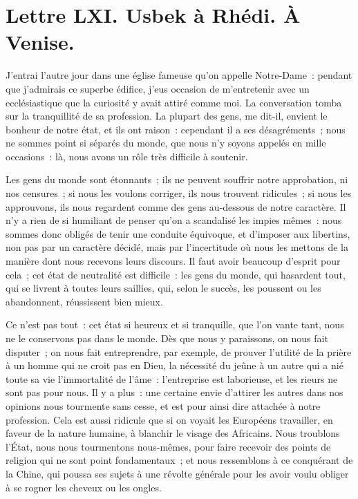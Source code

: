 \documentclass[french,twoside]{book} %
\newcommand{\dateline}[1]{\medskip{\RaggedLeft{#1}\par}\bigskip}
\begin{document}
\dateline{À Paris, le 18 de la lune de Saphar, 1714.}
\section[{Lettre LXI. Usbek à Rhédi. À Venise.}]{Lettre LXI. Usbek à Rhédi. À Venise.}\renewcommand{\leftmark}{Lettre LXI. Usbek à Rhédi. À Venise.}

\noindent J’entrai l’autre jour dans une église fameuse qu’on appelle Notre-Dame : pendant que j’admirais ce superbe édifice, j’eus occasion de m’entretenir avec un ecclésiastique que la curiosité y avait attiré comme moi. La conversation tomba sur la tranquillité de sa profession. La plupart des gens, me dit-il, envient le bonheur de notre état, et ils ont raison : cependant il a ses désagréments ; nous ne sommes point si séparés du monde, que nous n’y soyons appelés en mille occasions : là, nous avons un rôle très difficile à soutenir.\par
Les gens du monde sont étonnants ; ils ne peuvent souffrir notre approbation, ni nos censures ; si nous les voulons corriger, ils nous trouvent ridicules ; si nous les approuvons, ils nous regardent comme des gens au-dessous de notre caractère. Il n’y a rien de si humiliant de penser qu’on a scandalisé les impies mêmes : nous sommes donc obligés de tenir une conduite équivoque, et d’imposer aux libertins, non pas par un caractère décidé, mais par l’incertitude où nous les mettons de la manière dont nous recevons leurs discours. Il faut avoir beaucoup d’esprit pour cela ; cet état de neutralité est difficile : les gens du monde, qui hasardent tout, qui se livrent à toutes leurs saillies, qui, selon le succès, les poussent ou les abandonnent, réussissent bien mieux.\par
Ce n’est pas tout : cet état si heureux et si tranquille, que l’on vante tant, nous ne le conservons pas dans le monde. Dès que nous y paraissons, on nous fait disputer ; on nous fait entreprendre, par exemple, de prouver l’utilité de la prière à un homme qui ne croit pas en Dieu, la nécessité du jeûne à un autre qui a nié toute sa vie l’immortalité de l’âme : l’entreprise est laborieuse, et les rieurs ne sont pas pour nous. Il y a plus : une certaine envie d’attirer les autres dans nos opinions nous tourmente sans cesse, et est pour ainsi dire attachée à notre profession. Cela est aussi ridicule que si on voyait les Européens travailler, en faveur de la nature humaine, à blanchir le visage des Africains. Nous troublons l’État, nous nous tourmentons nous-mêmes, pour faire recevoir des points de religion qui ne sont point fondamentaux ; et nous ressemblons à ce conquérant de la Chine, qui poussa ses sujets à une révolte générale pour les avoir voulu obliger à se rogner les cheveux ou les ongles.\par
\end{document}

